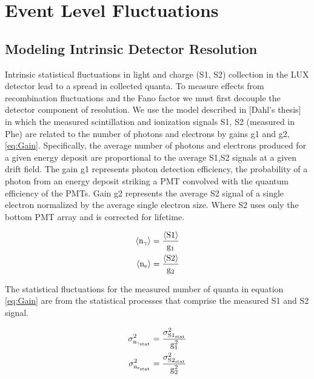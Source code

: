 \renewcommand{\thechapter}{5}

\chapter{Event Level Fluctuations}
\label{Ch:Flucs}

\section{Modeling Intrinsic Detector Resolution}

Intrinsic statistical fluctuations in light and charge (S1, S2) collection in the LUX detector lead to a spread in collected quanta. To measure effects from recombination fluctuations and the Fano factor we must first decouple the detector component of resolution. We use the model described in [Dahl's thesis] in which the measured scintillation and ionization signals S1, S2 (measured in Phe) are related to the number of photons and electrons by gains g1 and g2, \ref{eq:Gain}. Specifically, the average number of photons and electrons produced for a given energy deposit are proportional to the average S1,S2 signals at a given drift field. The gain g1 represents photon detection efficiency, the probability of a photon from an energy deposit striking a PMT convolved with the quantum efficiency of the PMTs. Gain g2 represents the average S2 signal of a single electron normalized by the average single electron size. Where S2 uses only the bottom PMT array and is corrected for lifetime.


\begin{equation}
\begin{split}
\rm  \left<n_\gamma\right> = \frac{\left<S1\right>}{g_1}\\
\rm \left<n_{e}\right> = \frac{\left<S2\right>}{g_2}
\label{eq:Gain}
\end{split}
\end{equation}

The statistical fluctuations for the measured number of quanta in equation \ref{eq:Gain} are from the statistical processes that comprise the measured S1 and S2 signal.

\begin{equation}
\begin{split}
\rm  \sigma_{n_{\gamma_{stat}}}^2 = \frac{\sigma_{S1_{stat}}^2}{g_1^2}\\
\rm \sigma_{n_{e_{stat}}}^2 = \frac{\sigma_{S2_{stat}}^2}{g_2^2}
\label{eq:Sig}
\end{split}
\end{equation}

